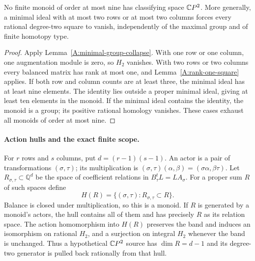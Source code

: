 \begin{corollary}
\label{A:monoids-nine}
No finite monoid of order at most nine has classifying space
$\mathbb{C}P^2$. More generally, a minimal ideal with at most two rows
or at most two columns forces every rational degree-two square
to vanish, independently of the maximal group and of finite
homotopy type.
\end{corollary}
\begin{proof}
Apply Lemma~\ref{A:minimal-group-collapse}. With one row or
one column, one augmentation module is zero, so $H_2$ vanishes.
With two rows or two columns every balanced matrix has rank
at most one, and Lemma~\ref{A:rank-one-square} applies.
If both row and column counts are at least three, the minimal
ideal has at least nine elements. The identity lies outside a
proper minimal ideal, giving at least ten elements in the
monoid. If the minimal ideal contains the identity, the monoid
is a group; its positive rational homology vanishes. These
cases exhaust all monoids of order at most nine.
\end{proof}

\paragraph{Action hulls and the exact finite scope.}
For $r$ rows and $s$ columns, put $d=(r-1)(s-1)$. An actor is
a pair of transformations $(\sigma,\tau)$; its multiplication
is $(\sigma,\tau)(\alpha,\beta)=(\sigma\alpha,\beta\tau)$.
Let $R_{\sigma,\tau}\subset\mathbb Q^d$ be the space of
coefficient relations in $B_\tau^tL=LA_\sigma$.
For a proper sum $R$ of such spaces define
\[
 H(R)=\{(\sigma,\tau):R_{\sigma,\tau}\subset R\}.
\]
Balance is closed under multiplication, so this is a monoid.
If $R$ is generated by a monoid's actors, the hull contains all
of them and has precisely $R$ as its relation space. The action
homomorphism into $H(R)$ preserves the band and induces an
isomorphism on rational $H_2$, and a surjection on integral
$H_2$ whenever the band is unchanged. Thus a hypothetical
$\mathbb{C}P^2$ source has $\dim R=d-1$ and its degree-two generator
is pulled back rationally from that hull.

